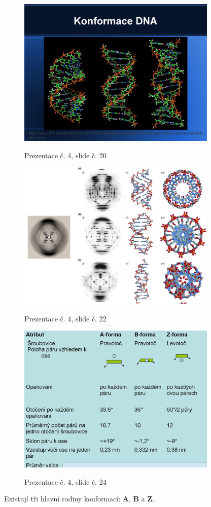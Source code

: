 \documentclass[DIV=8]{scrreprt}
\begin{document}
\begin{figure}
    \caption{Prezentace č. 4, slide č. 20}
    \includegraphics[width=0.85\textwidth]{slides-4/slide-20.jpg}
    \centering
    \label{slides-4-slide-20}
\end{figure}
\begin{figure}
    \caption{Prezentace č. 4, slide č. 22}
    \includegraphics[width=0.85\textwidth]{slides-4/slide-22.jpg}
    \centering
    \label{slides-4-slide-22}
\end{figure}
\begin{figure}
    \caption{Prezentace č. 4, slide č. 24}
    \includegraphics[width=0.85\textwidth]{slides-4/slide-24.jpg}
    \centering
    \label{slides-4-slide-24}
\end{figure}
 Existují tři hlavní rodiny konformací: \textbf{A}, \textbf{B} a \textbf{Z}.
\end{document}
